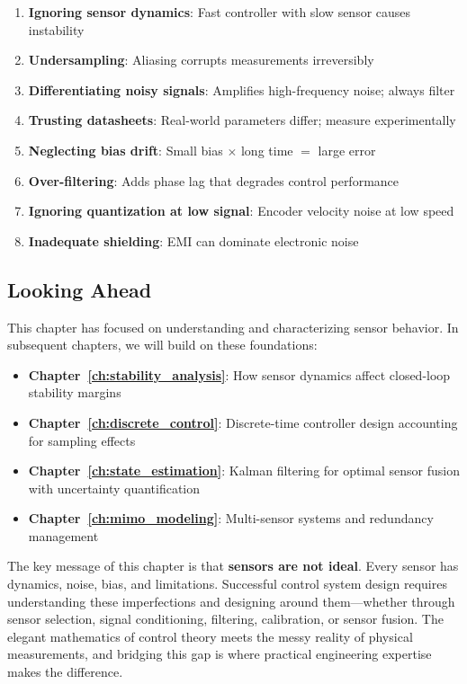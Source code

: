 \begin{enumerate}
    \item \textbf{Ignoring sensor dynamics}: Fast controller with slow sensor causes instability
    \item \textbf{Undersampling}: Aliasing corrupts measurements irreversibly
    \item \textbf{Differentiating noisy signals}: Amplifies high-frequency noise; always filter
    \item \textbf{Trusting datasheets}: Real-world parameters differ; measure experimentally
    \item \textbf{Neglecting bias drift}: Small bias $\times$ long time $=$ large error
    \item \textbf{Over-filtering}: Adds phase lag that degrades control performance
    \item \textbf{Ignoring quantization at low signal}: Encoder velocity noise at low speed
    \item \textbf{Inadequate shielding}: EMI can dominate electronic noise
\end{enumerate}

\subsection{Looking Ahead}

This chapter has focused on understanding and characterizing sensor behavior. In subsequent chapters, we will build on these foundations:

\begin{itemize}
    \item \textbf{Chapter~\ref{ch:stability_analysis}}: How sensor dynamics affect closed-loop stability margins
    \item \textbf{Chapter~\ref{ch:discrete_control}}: Discrete-time controller design accounting for sampling effects
    \item \textbf{Chapter~\ref{ch:state_estimation}}: Kalman filtering for optimal sensor fusion with uncertainty quantification
    \item \textbf{Chapter~\ref{ch:mimo_modeling}}: Multi-sensor systems and redundancy management
\end{itemize}

The key message of this chapter is that \textbf{sensors are not ideal}. Every sensor has dynamics, noise, bias, and limitations. Successful control system design requires understanding these imperfections and designing around them---whether through sensor selection, signal conditioning, filtering, calibration, or sensor fusion. The elegant mathematics of control theory meets the messy reality of physical measurements, and bridging this gap is where practical engineering expertise makes the difference.

